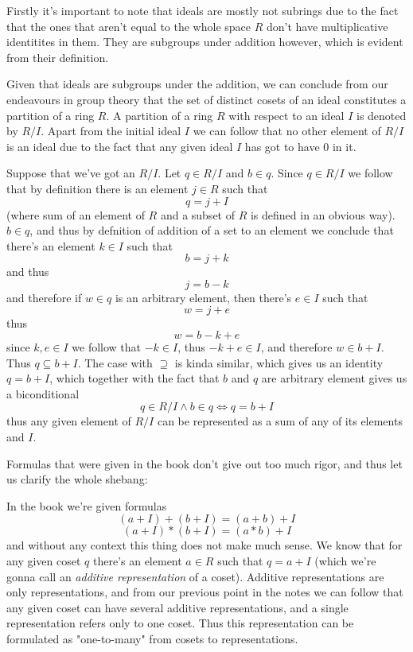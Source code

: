 \documentclass[11pt,oneside,titlepage]{book}
\DeclareMathOperator \lra {\Leftrightarrow}
\begin{document}
Firstly it's important to note that ideals are mostly not subrings due
to the fact that the ones that aren't equal to the whole space $R$
don't have multiplicative identitites in them. They are subgroups
under addition however, which is evident from their definition.

Given that ideals are subgroups under the addition, we can conclude
from our endeavours in group theory that the set of distinct cosets
of an ideal constitutes a partition of a ring $R$. A partition of a
ring $R$ with respect to an ideal $I$ is denoted by $R/I$. Apart from
the initial ideal $I$ we can follow that no other element of $R/I$ is
an ideal due to the fact that any given ideal $I$ has got to have $0$
in it.

Suppose that we've got an $R/I$. Let $q \in R/I$ and $b \in q$.  Since
$q \in R/I$ we follow that by definition there is an element $j \in R$
such that
$$q = j + I$$
(where sum of an element of $R$ and a subset of $R$ is defined in an
obvious way). $b \in q$, and thus by defnition of addition of a set to
an element we conclude that there's an element $k \in I$
such that
$$b = j + k$$
and thus
$$j = b - k$$
and therefore if $w \in q$ is an arbitrary element, then there's $e
\in I$ such that
$$w = j + e$$ 
thus
$$w = b - k + e$$
since $k, e \in I$ we follow that $-k \in I$, thus $-k + e \in I$, and
therefore $w \in b + I$. Thus $q \subseteq b + I$. The case with
$\supseteq$ is kinda similar, which gives us an identity $q = b + I$,
which together with the fact that $b$ and $q$ are arbitrary element
gives us a biconditional
$$q \in R/I \land b \in q \lra q = b + I$$
thus any given element of $R/I$ can be represented as a sum of any of
its elements and $I$.

Formulas that were given in the book don't give out too much
rigor, and thus let us clarify the whole shebang:

In the book we're given formulas
$$(a + I) + (b + I) = (a + b) + I$$
$$(a + I) * (b + I) = (a * b) + I$$
and without any context this thing does not make much sense. We know
that for any given coset $q$ there's an element $a \in R$ such that $q
= a + I$ (which we're gonna call an \textit{additive representation}
of a coset). Additive representations are only representations, and
from our previous point in the notes we can follow that any given
coset can have several additive representations, and a single representation
refers only to one coset. Thus this representation can be formulated
as "one-to-many" from cosets to representations.
\end{document}
